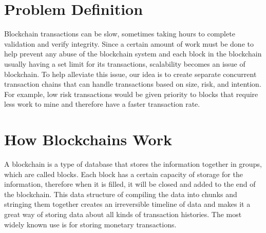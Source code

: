 \section{Problem Definition}

Blockchain transactions can be slow, sometimes taking hours to complete validation and verify integrity. Since a certain amount of work must be done to help prevent any abuse of the blockchain system and each block in the blockchain usually having a set limit for its transactions, scalability becomes an issue of blockchain. To help alleviate this issue, our idea is to create separate concurrent transaction chains that can handle transactions based on size, risk, and intention. For example, low risk transactions would be given priority to blocks that require less work to mine and therefore have a faster transaction rate. 

\section{How Blockchains Work}

A blockchain is a type of database that stores the information together in groups, which are called blocks. Each block has a certain capacity of storage for the information, therefore when it is filled, it will be closed and added to the end of the blockchain. This data structure of compiling the data into chunks and stringing them together creates an irreversible timeline of data and makes it a great way of storing data about all kinds of transaction histories. The most widely known use is for storing monetary transactions.

